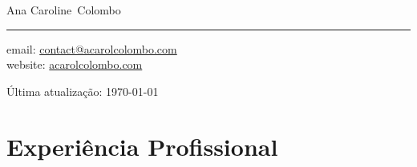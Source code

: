 \documentclass[11pt, a4paper]{article}
\makeatletter
\newcommand{\FirstName}{Ana Caroline}
\newcommand{\LastName}{Colombo}
\newcommand{\MyName}{\FirstName\ \LastName}
\newcommand{\Email}{contact@acarolcolombo.com}
\newcommand{\Website}{acarolcolombo.com}
\makeatother
\begin{document}
\thispagestyle{empty}


{\fontsize{20pt}{0}\selectfont \MyName}	\\[0.3cm]
\rule{\textwidth}{0.2pt}
\begin{minipage}[t]{0.595\textwidth}
	 email: \href{mailto:\Email}{\Email}
    \\
    website: \href{https://www.\Website}{\Website}
\end{minipage}
\begin{minipage}[t]{0.405\textwidth}
  \begin{flushright}
  Última atualização: \monthyear\today
  \\
  \end{flushright}
\end{minipage}

\section*{Experiência Profissional}
\end{document}
